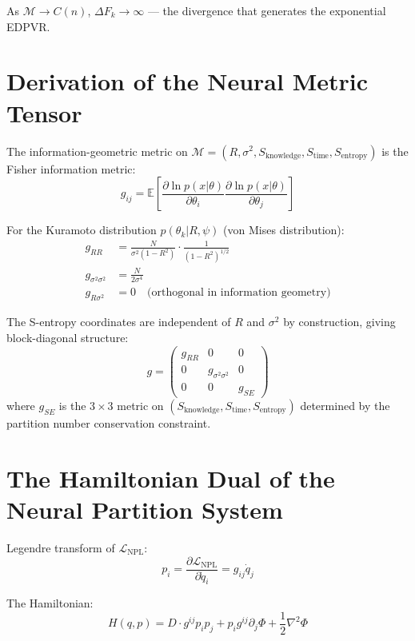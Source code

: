\documentclass[12pt,a4paper]{article}
\theoremstyle{definition}
\newcommand{\SE}{S_{\text{entropy}}}
\newcommand{\SK}{S_{\text{knowledge}}}
\newcommand{\ST}{S_{\text{time}}}
\newcommand{\calM}{\mathcal{M}}
\newcommand{\LNPL}{\mathcal{L}_{\text{NPL}}}
\begin{document}
As $\mathcal{M} \to C(n)$, $\Delta F_k \to \infty$ — the divergence that
generates the exponential EDPVR.

\section{Derivation of the Neural Metric Tensor}
\label{app:metric}

The information-geometric metric on $\calM = (R, \sigma^2, \SK, \ST, \SE)$
is the Fisher information metric:
\begin{equation}
g_{ij} = \mathbb{E}\left[\frac{\partial \ln p(x|\theta)}{\partial \theta_i}
\frac{\partial \ln p(x|\theta)}{\partial \theta_j}\right]
\end{equation}

For the Kuramoto distribution $p(\theta_k | R, \psi)$ (von Mises distribution):
\begin{align}
g_{RR} &= \frac{N}{\sigma^2(1-R^2)} \cdot \frac{1}{(1-R^2)^{1/2}}\\
g_{\sigma^2\sigma^2} &= \frac{N}{2\sigma^4}\\
g_{R\sigma^2} &= 0 \quad \text{(orthogonal in information geometry)}
\end{align}

The S-entropy coordinates are independent of $R$ and $\sigma^2$ by construction,
giving block-diagonal structure:
\begin{equation}
g = \begin{pmatrix} g_{RR} & 0 & 0 \\ 0 & g_{\sigma^2\sigma^2} & 0 \\ 0 & 0 & g_{SE} \end{pmatrix}
\end{equation}
where $g_{SE}$ is the $3\times 3$ metric on $(\SK, \ST, \SE)$ determined by
the partition number conservation constraint.

\section{The Hamiltonian Dual of the Neural Partition System}
\label{app:hamiltonian}

Legendre transform of $\LNPL$:
\begin{equation}
p_i = \frac{\partial \LNPL}{\partial \dot{q}_i} = g_{ij}\dot{q}_j
\end{equation}

The Hamiltonian:
\begin{equation}
H(q,p) = D \cdot g^{ij} p_i p_j + p_i g^{ij} \partial_j \Phi + \frac{1}{2}\nabla^2\Phi
\end{equation}
\end{document}
